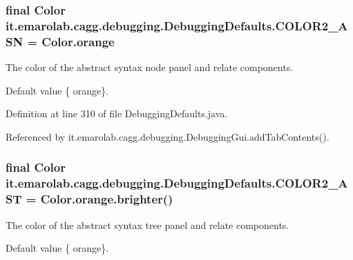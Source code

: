\hypertarget{classit_1_1emarolab_1_1cagg_1_1debugging_1_1DebuggingDefaults_a0b17fd18816e65e0ade6e5fe6f856421}{
\subsubsection[{C\-O\-L\-O\-R2\-\_\-\-A\-S\-N}]{\setlength{\rightskip}{0pt plus 5cm}final Color it.\-emarolab.\-cagg.\-debugging.\-Debugging\-Defaults.\-C\-O\-L\-O\-R2\-\_\-\-A\-S\-N = Color.\-orange\hspace{0.3cm}{\ttfamily [static]}}}\label{classit_1_1emarolab_1_1cagg_1_1debugging_1_1DebuggingDefaults_a0b17fd18816e65e0ade6e5fe6f856421}
The color of the abstract syntax node panel and relate components. \par
 Default value \{ orange\}. 

Definition at line 310 of file Debugging\-Defaults.\-java.



Referenced by it.\-emarolab.\-cagg.\-debugging.\-Debugging\-Gui.\-add\-Tab\-Contents().

\hypertarget{classit_1_1emarolab_1_1cagg_1_1debugging_1_1DebuggingDefaults_a1084bb5fb432224ea6ee2d5b2090ebc6}{
\subsubsection[{C\-O\-L\-O\-R2\-\_\-\-A\-S\-T}]{\setlength{\rightskip}{0pt plus 5cm}final Color it.\-emarolab.\-cagg.\-debugging.\-Debugging\-Defaults.\-C\-O\-L\-O\-R2\-\_\-\-A\-S\-T = Color.\-orange.\-brighter()\hspace{0.3cm}{\ttfamily [static]}}}\label{classit_1_1emarolab_1_1cagg_1_1debugging_1_1DebuggingDefaults_a1084bb5fb432224ea6ee2d5b2090ebc6}
The color of the abstract syntax tree panel and relate components. \par
 Default value \{ orange\}. 

